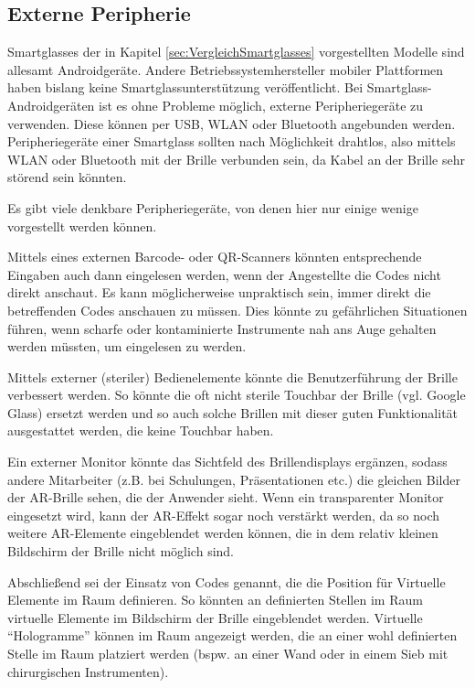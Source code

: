 \subsection{Externe Peripherie}
\label{sec:Externe_Peripherie}
Smartglasses der in Kapitel \ref{sec:VergleichSmartglasses} vorgestellten Modelle sind allesamt Androidgeräte. Andere Betriebssystemhersteller mobiler Plattformen haben bislang keine Smartglassunterstützung veröffentlicht. Bei Smartglass-Androidgeräten ist es ohne Probleme möglich, externe Peripheriegeräte zu verwenden. Diese können per USB, WLAN oder Bluetooth angebunden werden.  Peripheriegeräte einer Smartglass sollten nach Möglichkeit drahtlos, also mittels WLAN oder Bluetooth mit der Brille verbunden sein, da Kabel an der Brille sehr störend sein könnten. 

Es gibt viele denkbare Peripheriegeräte, von denen hier nur einige wenige vorgestellt werden können.

Mittels eines externen Barcode- oder QR-Scanners könnten entsprechende Eingaben auch dann eingelesen werden, wenn der Angestellte die Codes nicht direkt anschaut. Es kann möglicherweise unpraktisch sein, immer direkt die betreffenden Codes anschauen zu müssen. Dies könnte zu gefährlichen Situationen führen, wenn scharfe oder kontaminierte Instrumente nah ans Auge gehalten werden müssten, um eingelesen zu werden.

Mittels externer (steriler) Bedienelemente könnte die Benutzerführung der Brille verbessert werden. So könnte die oft nicht sterile Touchbar der Brille (vgl. Google Glass) ersetzt werden und so auch solche Brillen mit dieser guten Funktionalität ausgestattet werden, die keine Touchbar haben. 

Ein externer Monitor könnte das Sichtfeld des Brillendisplays ergänzen, sodass andere Mitarbeiter (z.B. bei Schulungen, Präsentationen etc.) die gleichen Bilder der AR-Brille sehen, die der Anwender sieht. Wenn ein transparenter Monitor eingesetzt wird, kann der AR-Effekt sogar noch verstärkt werden, da so noch weitere AR-Elemente eingeblendet werden können, die in dem relativ kleinen Bildschirm der Brille nicht möglich sind.

Abschließend sei der Einsatz von Codes genannt, die die Position für Virtuelle Elemente im Raum definieren. So könnten an definierten Stellen im Raum virtuelle Elemente im Bildschirm der Brille eingeblendet werden. Virtuelle \enquote{Hologramme} können im Raum angezeigt werden, die an einer wohl definierten Stelle im Raum platziert werden (bspw. an einer Wand oder in einem Sieb mit chirurgischen Instrumenten).
%
%
%
%
%
%
